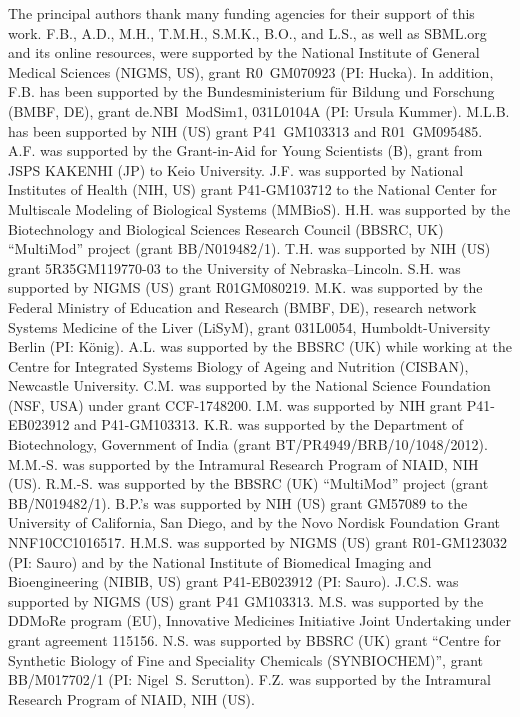 \documentclass{sbml-paper}
\begin{document}
The principal authors thank many funding agencies for their support of this work.  F.B., A.D., M.H., T.M.H., S.M.K., B.O., and L.S., as well as SBML.org and its online resources, were supported by the National Institute of General Medical Sciences (NIGMS, US), grant \No R0~GM070923 (PI: Hucka).  In addition, F.B. has been supported by the Bundesministerium f\"{u}r Bildung und Forschung (BMBF, DE), grant \No de.NBI~ModSim1, 031L0104A (PI: Ursula Kummer).  M.L.B. has been supported by NIH (US) grant \No P41~GM103313 and R01~GM095485.  A.F. was supported by the Grant-in-Aid for Young Scientists (B), grant  from JSPS KAKENHI (JP) to Keio University.  J.F. was supported by National Institutes of Health (NIH, US) grant \No P41-GM103712 to the National Center for Multiscale Modeling of Biological Systems (MMBioS).  H.H. was supported by the Biotechnology and Biological Sciences Research Council (BBSRC, UK) ``MultiMod'' project (grant \No BB/N019482/1).  T.H. was supported by NIH (US) grant \No 5R35GM119770-03 to the University of Nebraska--Lincoln.  S.H. was supported by NIGMS (US) grant \No R01GM080219.  M.K. was supported by the Federal Ministry of Education and Research (BMBF, DE), research network Systems Medicine of the Liver (LiSyM), grant \No 031L0054, Humboldt-University Berlin (PI: K\"{o}nig).  A.L. was supported by the BBSRC (UK) while working at the Centre for Integrated Systems Biology of Ageing and Nutrition (CISBAN), Newcastle University.  C.M. was supported by the National Science Foundation (NSF, USA) under grant \No CCF-1748200.  I.M. was supported by NIH grant \No P41-EB023912 and P41-GM103313.  K.R. was supported by the Department of Biotechnology, Government of India (grant \No BT/PR4949/BRB/10/1048/2012).  M.M.-S. was supported by the Intramural Research Program of NIAID, NIH (US).  R.M.-S. was supported by the BBSRC (UK) ``MultiMod'' project (grant \No BB/N019482/1).  B.P.'s was supported by NIH (US) grant \No GM57089 to the University of California, San Diego, and by the Novo Nordisk Foundation Grant \No NNF10CC1016517.  H.M.S. was supported by NIGMS (US) grant \No R01-GM123032 (PI: Sauro) and by the National Institute of Biomedical Imaging and Bioengineering (NIBIB, US) grant \No P41-EB023912 (PI: Sauro).  J.C.S. was supported by NIGMS (US) grant P41 GM103313.  M.S. was supported by the DDMoRe program (EU), Innovative Medicines Initiative Joint Undertaking under grant agreement 115156.  N.S. was supported by BBSRC (UK) grant ``Centre for Synthetic Biology of Fine and Speciality Chemicals (SYNBIOCHEM)'', grant \No BB/M017702/1 (PI: Nigel~S. Scrutton).  F.Z. was supported by the Intramural Research Program of NIAID, NIH (US).
\end{document}
